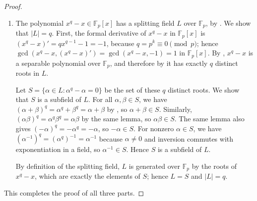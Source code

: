 \begin{proof}
\begin{enumerate}
\begin{enumerate}
            \item The polynomial $x^q - x \in \mathbb{F}_p[x]$ has a splitting field $L$ over $\mathbb{F}_p$, by . We show that $|L| = q$. First, the formal derivative of $x^q - x$ in $\mathbb{F}_p[x]$ is $(x^q - x)' = qx^{q-1} - 1 = -1$, because $q = p^k \equiv 0 \pmod{p}$; hence $\gcd(x^q - x, (x^q - x)') = \gcd(x^q - x, -1) = 1$ in $\mathbb{F}_p[x]$. By , $x^q - x$ is a separable polynomial over $\mathbb{F}_p$, and therefore by  it has exactly $q$ distinct roots in $L$.

            Let $S = \{\alpha \in L : \alpha^q - \alpha = 0\}$ be the set of these $q$ distinct roots. We show that $S$ is a subfield of $L$. For all $\alpha, \beta \in S$, we have $(\alpha + \beta)^q = \alpha^q + \beta^q = \alpha + \beta$ by , so $\alpha + \beta \in S$. Similarly, $(\alpha\beta)^q = \alpha^q \beta^q = \alpha\beta$ by the same lemma, so $\alpha\beta \in S$. The same lemma also gives $(-\alpha)^q = -\alpha^q = -\alpha$, so $-\alpha \in S$. For nonzero $\alpha \in S$, we have $(\alpha^{-1})^q = (\alpha^q)^{-1} = \alpha^{-1}$ because $\alpha \neq 0$ and inversion commutes with exponentiation in a field, so $\alpha^{-1} \in S$. Hence $S$ is a subfield of $L$.

            By definition of the splitting field, $L$ is generated over $\mathbb{F}_p$ by the roots of $x^q - x$, which are exactly the elements of $S$; hence $L = S$ and $|L| = q$.
        \end{enumerate}
    \end{enumerate}
    This completes the proof of all three parts.
\end{proof}